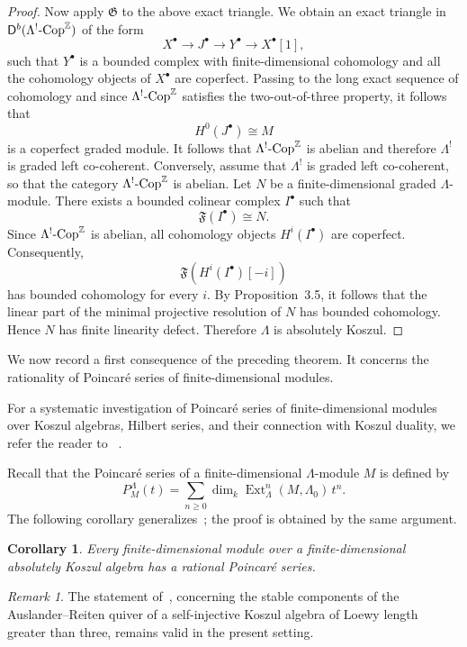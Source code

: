 \documentclass[11pt]{article}
\newtheorem{corollary}[theorem]{Corollary}
\theoremstyle{definition}
\theoremstyle{remark}
\newtheorem{remark}[theorem]{Remark}
\begin{document}
\begin{proof}
Now apply \(\mathfrak{G}\) to the above exact triangle. We obtain an exact triangle in \(\mathsf{D}^{b}(\Lambda^{!}\textup{-Cop}^{\mathbb{Z}})\) of the form
\[
X^\bullet \longrightarrow J^\bullet \longrightarrow Y^\bullet \longrightarrow X^\bullet[1],
\]
such that \(Y^\bullet\) is a bounded complex with finite-dimensional cohomology and all the cohomology objects of \(X^\bullet\) are coperfect. Passing to the long exact sequence of cohomology and since \(\Lambda^{!}\textup{-Cop}^{\mathbb{Z}}\) satisfies the two-out-of-three property, it follows that
\[
H^{0}(J^\bullet)\cong M
\]
is a coperfect graded module. It follows that 
\(\Lambda^{!}\textup{-Cop}^{\mathbb{Z}}\) is abelian and therefore \(\Lambda^{!}\) is graded left co-coherent.
Conversely, assume that \(\Lambda^{!}\) is graded left co-coherent, so that the category \(\Lambda^{!}\textup{-Cop}^{\mathbb{Z}}\) is abelian. Let \(N\) be a finite-dimensional graded \(\Lambda\)-module. There exists a bounded colinear complex \(I^\bullet\) such that
\[
\mathfrak{F}(I^\bullet)\cong N.
\]
Since \(\Lambda^{!}\textup{-Cop}^{\mathbb{Z}}\) is abelian, all cohomology objects \(H^{i}(I^\bullet)\) are coperfect. Consequently,
\[
\mathfrak{F}(H^{i}(I^\bullet)[-i])
\]
has bounded cohomology for every \(i\). By Proposition~3.5, it follows that the linear part of the minimal projective resolution of \(N\) has bounded cohomology. Hence \(N\) has finite linearity defect. Therefore \(\Lambda\) is absolutely Koszul.
\end{proof}

We now record a first consequence of the preceding theorem. It concerns the
rationality of Poincar\'e series of finite-dimensional modules.

For a systematic investigation of Poincar\'e series of finite-dimensional
modules over Koszul algebras, Hilbert series, and their connection with Koszul
duality, we refer the reader to ~\cite{21}. 
\medskip

Recall that the Poincar\'e series of a
finite-dimensional \(\Lambda\)-module \(M\) is defined by
\[
P^{\Lambda}_{M}(t)
=
\sum_{n\geq 0}
\dim_{k}\operatorname{Ext}^{n}_{\Lambda}(M,\Lambda_{0})\,t^{n}.
\]
The following corollary generalizes~\cite[Theorem~4.7]{19}; the proof is
obtained by the same argument.

\begin{corollary}
Every finite-dimensional module over a finite-dimensional absolutely Koszul algebra has a rational Poincar\'e series.
\end{corollary}
\begin{remark}
The statement of~\cite[Theorem~5.8]{19}, concerning the stable components of the Auslander--Reiten quiver of a self-injective Koszul algebra of Loewy length greater than three, remains valid in the present setting.
\end{remark}
\end{document}
